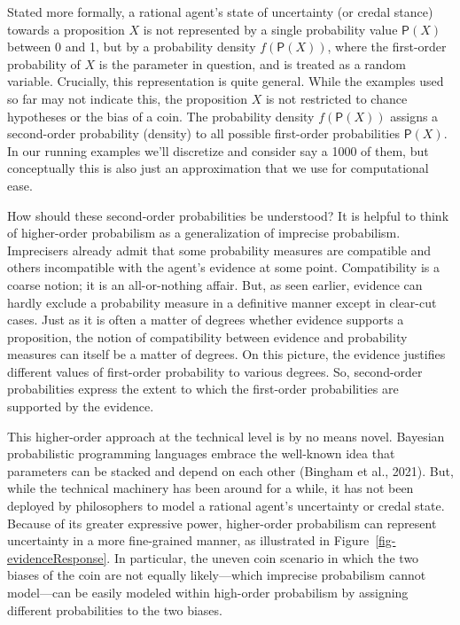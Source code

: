 \documentclass[
  letterpaper,
  DIV=11,
  numbers=noendperiod]{scrartcl}
\begin{document}
Stated more formally, a rational agent's state of uncertainty (or credal
stance) towards a proposition \(X\) is not represented by a single
probability value \(\mathsf{P}(X)\) between 0 and 1, but by a
probability density \(f(\mathsf{P}(X))\), where the first-order
probability of \(X\) is the parameter in question, and is treated as a
random variable. Crucially, this representation is quite general. While
the examples used so far may not indicate this, the proposition \(X\) is
not restricted to chance hypotheses or the bias of a coin. The
probability density \(f(\mathsf{P}(X))\) assigns a second-order
probability (density) to all possible first-order probabilities
\(\mathsf{P}(X)\). In our running examples we'll discretize and consider
say a 1000 of them, but conceptually this is also just an approximation
that we use for computational ease.

How should these second-order probabilities be understood? It is helpful
to think of higher-order probabilism as a generalization of imprecise
probabilism. Imprecisers already admit that some probability measures
are compatible and others incompatible with the agent's evidence at some
point. Compatibility is a coarse notion; it is an all-or-nothing affair.
But, as seen earlier, evidence can hardly exclude a probability measure
in a definitive manner except in clear-cut cases. Just as it is often a
matter of degrees whether evidence supports a proposition, the notion of
compatibility between evidence and probability measures can itself be a
matter of degrees. On this picture, the evidence justifies different
values of first-order probability to various degrees. So, second-order
probabilities express the extent to which the first-order probabilities
are supported by the evidence.

This higher-order approach at the technical level is by no means novel.
Bayesian probabilistic programming languages embrace the well-known idea
that parameters can be stacked and depend on each other (Bingham et al.,
2021). But, while the technical machinery has been around for a while,
it has not been deployed by philosophers to model a rational agent's
uncertainty or credal state. Because of its greater expressive power,
higher-order probabilism can represent uncertainty in a more
fine-grained manner, as illustrated in
Figure~\ref{fig-evidenceResponse}. In particular, the uneven coin
scenario in which the two biases of the coin are not equally
likely---which imprecise probabilism cannot model---can be easily
modeled within high-order probabilism by assigning different
probabilities to the two biases.
\end{document}
